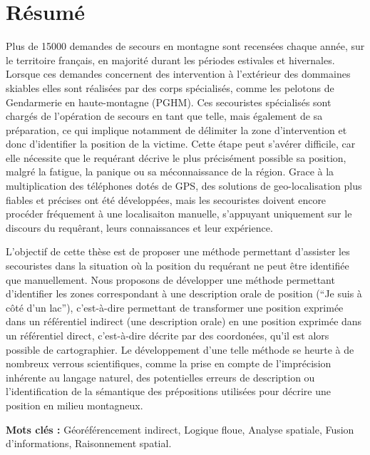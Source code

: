 \section*{Résumé}

Plus de \num{15000} demandes de secours en montagne sont recensées chaque
année, sur le territoire français, en majorité durant les périodes
estivales et hivernales. Lorsque ces demandes concernent des
intervention à l'extérieur des dommaines skiables elles sont réalisées
par des corps spécialisés, comme les pelotons de Gendarmerie en
haute-montagne (PGHM). Ces secouristes spécialisés sont chargés de
l'opération de secours en tant que telle, mais également de sa
préparation, ce qui implique notamment de délimiter la zone
d'intervention et donc d'identifier la position de la victime. Cette
étape peut s'avérer difficile, car elle nécessite que le requérant
décrive le plus précisément possible sa position, malgré la fatigue,
la panique ou sa méconnaissance de la région. Grace à la
multiplication des téléphones dotés de GPS, des solutions de
geo-localisation plus fiables et précises ont été développées, mais
les secouristes doivent encore procéder fréquement à une localisaiton
manuelle, s'appuyant uniquement sur le discours du requêrant, leurs
connaissances et leur expérience.

L'objectif de cette thèse est de proposer une méthode permettant
d'assister les secouristes dans la situation où la position du
requérant ne peut être identifiée que manuellement. Nous proposons de
développer une méthode permettant d'identifier les zones correspondant
à une description orale de position (\eg \enquote{Je suis à côté d'un lac}),
c'est-à-dire permettant de transformer une position exprimée dans un
référentiel indirect (une description orale) en une position exprimée
dans un référentiel direct, c'est-à-dire décrite par des coordonées,
qu'il est alors possible de cartographier. Le développement d'une
telle méthode se heurte à de nombreux verrous scientifiques, comme la
prise en compte de l'imprécision inhérente au langage naturel, des
potentielles erreurs de description ou l’identification de la
sémantique des prépositions utilisées pour décrire une position en
milieu montagneux.

\vspace{.5cm}

\noindent\textbf{Mots clés :} Géoréférencement indirect, Logique
floue, Analyse spatiale, Fusion d'informations, Raisonnement spatial.\par

